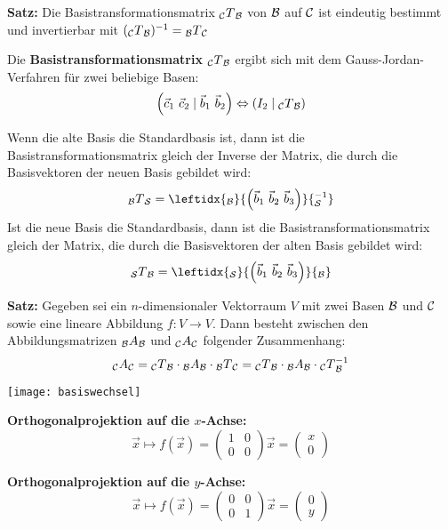 \textbf{Satz:} Die Basistransformationsmatrix ${_{\mathcal{C}}}T{_{\mathcal{B}}}$ von $\mathcal{B}$ auf $\mathcal{C}$ ist eindeutig bestimmt und invertierbar mit $({_{\mathcal{C}}}T{_{\mathcal{B}}})^{-1} = {_{\mathcal{B}}}T{_{\mathcal{C}}}$

Die \textbf{Basistransformationsmatrix} ${_{\mathcal{C}}}T{_{\mathcal{B}}}$ ergibt sich mit dem Gauss-Jordan-Verfahren
für zwei beliebige Basen:
\[\left( \vec{c}_1 \ \vec{c}_2 \mid \vec{b}_1 \ \vec{b}_2 \right) \Leftrightarrow \left( I_2 \mid {_\C}T{_\B} \right)\]

Wenn die alte Basis die Standardbasis ist, dann ist die Basistransformationsmatrix gleich der Inverse der Matrix, die durch die Basisvektoren der neuen Basis gebildet wird:
\[{_\B}T{_\S} = \leftidx{_\B}{\left( \vec{b}_1 \ \vec{b}_2 \ \vec{b}_3 \right)}{_\S^{-1}}\]
Ist die neue Basis die Standardbasis, dann ist die Basistransformationsmatrix gleich der Matrix, die durch die Basisvektoren der alten Basis gebildet wird:
\[{_\S}T{_\B} = \leftidx{_\S}{\left( \vec{b}_1 \ \vec{b}_2 \ \vec{b}_3 \right)}{_\B}\]

\textbf{Satz:} Gegeben sei ein $n$-dimensionaler Vektorraum $V$ mit zwei Basen $\mathcal{B}$ und $\mathcal{C}$ sowie eine lineare Abbildung $f: V \rightarrow V$.
Dann besteht zwischen den Abbildungsmatrizen ${_{\mathcal{B}}}A{_{\mathcal{B}}}$ und ${_{\mathcal{C}}}A{_{\mathcal{C}}}$ folgender Zusammenhang:
\[{_{\mathcal{C}}}A{_{\mathcal{C}}} = {_{\mathcal{C}}}T{_{\mathcal{B}}} \cdot {_{\mathcal{B}}}A{_{\mathcal{B}}} \cdot {_{\mathcal{B}}}T{_{\mathcal{C}}} = {_{\mathcal{C}}}T{_{\mathcal{B}}} \cdot {_{\mathcal{B}}}A{_{\mathcal{B}}} \cdot {_{\mathcal{C}}}T{_{\mathcal{B}}^{-1}}\]

\texttt{[image: basiswechsel]}



\textbf{Orthogonalprojektion auf die $x$-Achse:}
\[\vec{x} \mapsto f(\vec{x}) = \left(
\begin{array}{cc}
    1 & 0 \\ 0 & 0
\end{array}
\right) \vec{x} = \left(
\begin{array}{c}
    x \\ 0
\end{array}
\right)\]

\textbf{Orthogonalprojektion auf die $y$-Achse:}
\[\vec{x} \mapsto f(\vec{x}) = \left(
\begin{array}{cc}
    0 & 0 \\ 0 & 1
\end{array}
\right) \vec{x} = \left(
\begin{array}{c}
    0 \\ y
\end{array}
\right)\]

